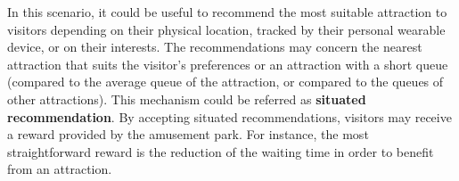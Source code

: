 In this scenario, it could be useful to recommend the most suitable attraction to visitors depending on their physical location, tracked by their personal wearable device, or on their interests.
The recommendations may concern the nearest attraction that suits the visitor's preferences or an attraction with a short queue (compared to the average queue of the attraction, or compared to the queues of other attractions).
This mechanism could be referred as \textbf{situated recommendation}.
By accepting situated recommendations, visitors may receive a reward provided by the amusement park.
For instance, the most straightforward reward is the reduction of the waiting time in order to benefit from an attraction.
